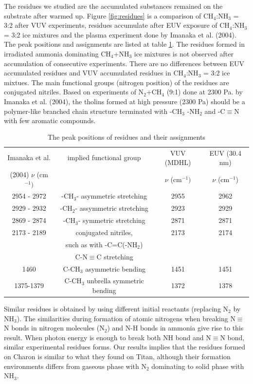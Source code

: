 The residues we studied are the accumulated substances remained on the substrate after warmed up. Figure \ref{fig:residues} is a comparison of CH$_4$:NH$_3$ = 3:2 after VUV experiments, residues accumulate after EUV exposure of CH$_4$:NH$_3$ = 3:2 ice mixtures and the plasma experiment done by Imanaka et al. (2004)\cite{imanaka2004laboratory}. The peak positions and assignments are listed at table \ref{tab:residue}. The residues formed in irradiated ammonia dominating CH$_4$+NH$_3$ ice mixtures is not observed after accumulation of consecutive experiments. There are no differences between EUV accumulated residues and VUV accumulated residues in CH$_4$:NH$_3$ = 3:2 ice mixtues. The main functional groups (nitrogen position) of the residues are conjugated nitriles. Based on experiments of N$_2$+CH$_4$ (9:1) done at 2300 Pa. by Imanaka et al. (2004)\cite{imanaka2004laboratory}, the tholins formed at high pressure (2300 Pa) should be a polymer-like branched chain structure terminated with -CH$_3$ -NH$_2$ and -C$\equiv$N with few aromatic compounds.\\

\begin{table}[htbp]
\caption{The peak positions of residues and their assignments}
\label{tab:residue}
\begin{tabular}{cccc}
\hline
\hline
Imanaka et al. & implied functional group & VUV (MDHL) & EUV (30.4 nm)\\
(2004) $\nu$ (cm$^{-1})$ & & $\nu$ (cm$^{-1})$ & $\nu$ (cm$^{-1}$) \\
\hline
2954 - 2972 & -CH$_3$- asymmetric stretching & 2955 & 2962 \\
2929 - 2932 & -CH$_2$- assymmetric stretching & 2923 & 2929 \\
2869 - 2874 & -CH$_3$- symmetric stretching & 2871 & 2871 \\
2173 - 2189 & conjugated nitriles, & 2173 & 2174 \\
 & such as with -C=C(-NH$_2$)& & \\
 & C-N$\equiv$C stretching& & \\
1460 & C-CH$_3$ asymmetric bending & 1451 & 1451 \\
1375-1379 & C-CH$_3$ unbrella symmetric bending & 1372 & 1378 \\
\hline
\end{tabular}
\end{table}

Similar residues is obtained by using different initial reactants (replacing N$_2$ by NH$_3$). The similarities during formation of atomic nitrogens when breaking N$\equiv$N bonds in nitrogen molecules (N$_2$) and N-H bonds in ammonia give rise to this result. When photon energy is enough to break both NH bond and N$\equiv$N bond, similar experimental residues forms. Our results implies that the residues formed on Charon is similar to what they found on Titan, although their formation environments differs from gaseous phase with N$_2$ dominating to solid phase with NH$_3$.\\

